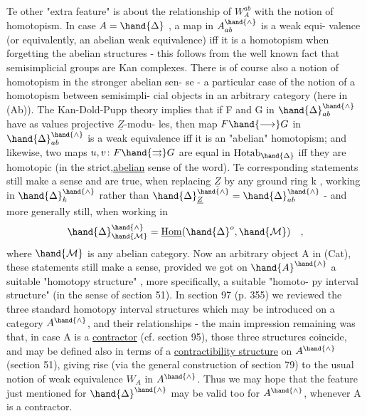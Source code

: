 
Te other "extra feature"  is about  the relationship of $W^{ab}_{A}$  with
the notion of homotopism.  In case $A = \hand{\Delta}$ ,  a map in $A^{\hand{\wedge}}_{ab}$  is a weak equi-%
valence (or equivalently,  an abelian weak equivalence)  iff it is a
homotopism when forgetting the abelian structures  -  this follows from
the well known fact that semisimplicial groups are Kan complexes.  There
is of course also a notion  of homotopism in the stronger abelian sen-%
se -  a particular case of the notion of a homotopism between semisimpli-%
cial objects in an arbitrary category (here in (Ab)).  The Kan-Dold-Pupp
theory implies that if F and G in $\hand{\Delta}^{\hand{\wedge}}_{ab}$  have as values projective $\underline{Z}$-modu-%
les,  then  map  $F \hand{\longrightarrow} G$ in $\hand{\Delta}^{\hand{\wedge}}_{ab}$  is a weak equivalence iff it is an
"abelian" homotopism;  and likewise,  two maps  $u,v\colon F \hand{\rightrightarrows} G$  are equal
in $\mathrm{Hotab}_{\hand{\Delta}}$  iff they are homotopic (in the strict,\uline{abelian} sense of the
word).  Te corresponding statements still make a sense and are true,
when replacing $\underline{Z}$ by any ground ring k ,  working in $\hand{\Delta}^{\hand{\wedge}}_{k}$  rather than
$\hand{\Delta}^{\hand{\wedge}}_{\underline{Z}} = \hand{\Delta}^{\hand{\wedge}}_{ab}$   -  and more generally still,  when working in
\[ \hand{\Delta}^{\hand{\wedge}}_{\hand{\mathcal{M}}} = \underline{\mathrm{Hom}}(\hand{\Delta}^{o}, \hand{\mathcal{M}}) \quad , \]
where $\hand{\mathcal{M}}$ is any abelian category.  Now   an arbitrary object A in
(Cat),  these statements still make a sense,  provided we got on $\hand{A}^{\hand{\wedge}}$ a
suitable "homotopy structure" ,  more specifically,  a suitable "homoto-%
py interval structure" (in the sense of section 51).  In section 97
(p. 355) we reviewed the three standard homotopy interval structures
which may be introduced on a category $A^{\hand{\wedge}}$,  and their relationships -
the main impression remaining was that,  in case A is a \uline{contractor}
(cf. section 95),  those three structures coincide,  and may be defined
also in terms of a \uline{contractibility structure} on $A^{\hand{\wedge}}$ (section 51),  giving
rise (via the general construction of section 79) to the usual notion
of weak equivalence $W_{A}$ in $A^{\hand{\wedge}}$.  Thus we may hope that the feature just
mentioned  for $\hand{\Delta}^{\hand{\wedge}}$ may be valid too for $A^{\hand{\wedge}}$,  whenever A is a contractor.

